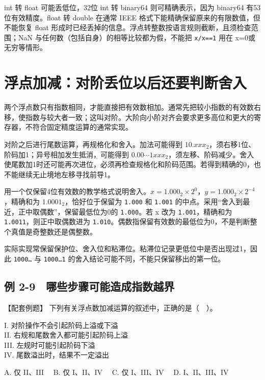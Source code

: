 int 转 float 可能丢低位，32位 int 转 binary64 则可精确表示，因为 binary64 有53位有效精度。float 转 double 在通常 IEEE 格式下能精确保留原来的有限数值，但不能恢复 float 形成时已经丢掉的信息。浮点转整数按语言规则截断，且须检查范围；NaN 与任何数（包括自身）的相等比较都为假，不能把 \texttt{x/\allowbreak{}x=\allowbreak{}=\allowbreak{}1} 用在 x=0或无穷等情形。

\section{浮点加减：对阶丢位以后还要判断舍入}\label{CO02-21}

两个浮点数只有指数相同，才能直接把有效数相加。通常先把较小指数的有效数右移，使指数与较大者一致；这叫对阶。大阶向小阶对齐会要求更多高位和更大的寄存器，不符合固定精度运算的通常实现。

对阶之后进行尾数运算，再规格化和舍入。加法可能得到 \(10.xxx_2\)，须右移1位、阶码加1；异号相加发生抵消，可能得到 \(0.00\cdots1xxx_2\)，须左移、阶码减少。舍入使尾数加1时还可能再次进位，必须再检查规格化和阶码范围。若得到精确的0，也不能继续无止境地左移寻找前导1。

用一个仅保留4位有效数的教学格式说明舍入。\(x=1.000_2\times2^0\)，\(y=1.000_2\times2^{-4}\)，精确和为 \(1.0001_2\)，恰好位于保留为 \texttt{1.\allowbreak{}000} 和 \texttt{1.\allowbreak{}001} 的中点。采用``舍入到最近，正中取偶数''，保留最低位为0的 \texttt{1.\allowbreak{}000}。若 x 改为 \texttt{1.\allowbreak{}001}，精确和为 \texttt{1.\allowbreak{}0011}，则正中取偶数进为 \texttt{1.\allowbreak{}010}。偶数指保留有效数的最低位为0，不是判断整个真值是奇整数还是偶整数。

实际实现常保留保护位、舍入位和粘滞位。粘滞位记录更低位中是否出现过1，因此 \texttt{1000…} 与 \texttt{1000…1} 的舍入结论可能不同，不能只保留移出的第一位。

\subsection{例 2-9　哪些步骤可能造成指数越界}\label{CO02-22}

\begin{example}[配套例题]

【配套例题】 下列有关浮点数加减运算的叙述中，正确的是（　）。

I. 对阶操作不会引起阶码上溢或下溢\\
II. 右规和尾数舍入都可能引起阶码上溢\\
III. 左规时可能引起阶码下溢\\
IV. 尾数溢出时，结果不一定溢出

A. 仅 II、III　 B. 仅 I、II、IV　 C. 仅 I、III、IV　 D. I、II、III、IV

\end{example}

